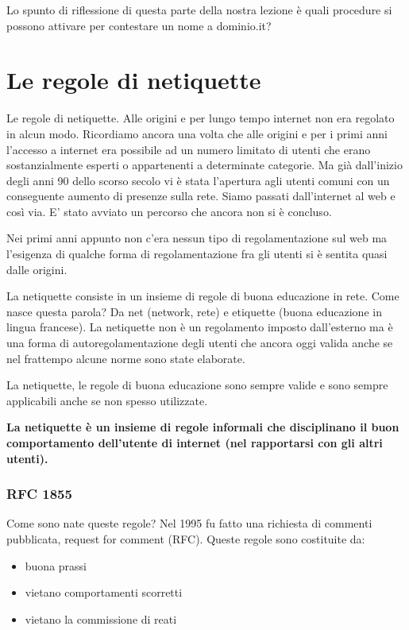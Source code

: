 Lo spunto di riflessione di questa parte della nostra lezione è quali procedure si possono attivare per contestare un nome a dominio.it?

\section{Le regole di netiquette}

Le regole di netiquette. Alle origini e per lungo tempo internet non era regolato in alcun modo. Ricordiamo ancora una volta che alle origini e per i primi anni l'accesso a internet era possibile ad un numero limitato di utenti che erano sostanzialmente esperti o appartenenti a determinate categorie. Ma già dall'inizio degli anni 90 dello scorso secolo vi è stata l'apertura agli utenti comuni con un conseguente aumento di presenze sulla rete. Siamo passati dall'internet al web e così via. E' stato avviato un percorso che ancora non si è concluso.\par
Nei primi anni appunto non c'era nessun tipo di regolamentazione sul web ma l'esigenza di qualche forma di regolamentazione fra gli utenti si è sentita quasi dalle origini.\par 
La netiquette consiste in un insieme di regole di buona educazione in rete. Come nasce questa parola? Da net (network, rete) e etiquette (buona educazione in lingua francese). La netiquette non è un regolamento imposto dall'esterno ma è una forma di autoregolamentazione degli utenti che ancora oggi valida anche se nel frattempo alcune norme sono state elaborate.\par
La netiquette, le regole di buona educazione sono sempre valide e sono sempre applicabili anche se non spesso utilizzate.\par
\textbf{La netiquette è un insieme di regole informali che disciplinano il buon comportamento dell'utente di internet (nel rapportarsi con gli altri utenti).}\par
\subsubsection{RFC 1855}
Come sono nate queste regole? Nel 1995 fu fatto una richiesta di commenti pubblicata, request for comment (RFC). Queste regole sono costituite da:

\begin{itemize}
    \item buona prassi 
    \item vietano comportamenti scorretti
    \item vietano la commissione di reati 
\end{itemize}

